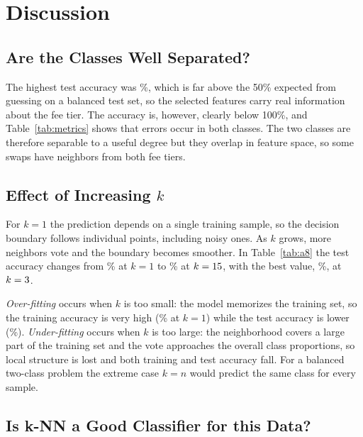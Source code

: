 \documentclass[conference]{IEEEtran}
\begin{document}

\section{Discussion}


\subsection{Are the Classes Well Separated?}

The highest test accuracy was \bestAccNormal\%, which is far above the 50\% expected from guessing on a balanced test set, so the selected features carry real information about the fee tier. The accuracy is, however, clearly below 100\%, and Table~\ref{tab:metrics} shows that errors occur in both classes. The two classes are therefore separable to a useful degree but they overlap in feature space, so some swaps have neighbors from both fee tiers.

\subsection{Effect of Increasing $k$}

For $k=1$ the prediction depends on a single training sample, so the decision boundary follows individual points, including noisy ones. As $k$ grows, more neighbors vote and the boundary becomes smoother. In Table~\ref{tab:a8} the test accuracy changes from \testAccOne\% at $k=1$ to \testAccLast\% at $k=15$, with the best value, \bestAccNormal\%, at $k=3$.

\textit{Over-fitting} occurs when $k$ is too small: the model memorizes the training set, so the training accuracy is very high (\trainAccOne\% at $k=1$) while the test accuracy is lower (\testAccOne\%). \textit{Under-fitting} occurs when $k$ is too large: the neighborhood covers a large part of the training set and the vote approaches the overall class proportions, so local structure is lost and both training and test accuracy fall. For a balanced two-class problem the extreme case $k=n$ would predict the same class for every sample.

\subsection{Is k-NN a Good Classifier for this Data?}
\end{document}
